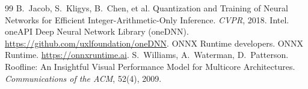 \documentclass[11pt,a4paper]{ctexart}
\begin{document}
\begin{thebibliography}{99}
 B.~Jacob, S.~Kligys, B.~Chen, et al. Quantization and Training of Neural Networks for Efficient Integer-Arithmetic-Only Inference. \emph{CVPR}, 2018.
 Intel. oneAPI Deep Neural Network Library (oneDNN). \url{https://github.com/uxlfoundation/oneDNN}.
 ONNX Runtime developers. ONNX Runtime. \url{https://onnxruntime.ai}.
 S.~Williams, A.~Waterman, D.~Patterson. Roofline: An Insightful Visual Performance Model for Multicore Architectures. \emph{Communications of the ACM}, 52(4), 2009.
\end{thebibliography}
\end{document}
